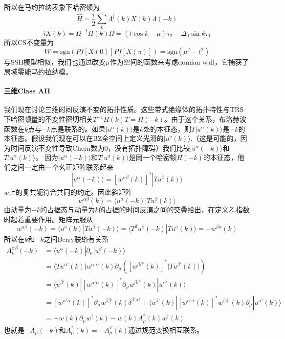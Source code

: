 \documentclass[a4paper]{article}
\numberwithin{equation}{subsection}
\begin{document}
所以在马约拉纳表象下哈密顿为
\begin{equation}
    \hat{H}=\frac{i}{2}\sum_{k}\Lambda^\dagger(k)X(k)\Lambda(-k)
\end{equation}
\begin{equation}
    iX(k)=\Omega^{-1}H(k)\Omega=(t\cos k-\mu)\tau_2-\Delta_0\sin k\tau_1
\end{equation}
所以CS不变量为
\begin{equation}
    W=\mathrm{sgn}(Pf[X(0)]Pf[X(\pi)])=\mathrm{sgn}(\mu^2-t^2)
\end{equation}
与SSH模型相似，我们也通过改变$\mu$作为空间的函数来考虑domian wall，它捕获了局域零能马约拉纳模。
\paragraph{三维Class AII}
我们现在讨论三维时间反演不变的拓扑性质。这些带式绝缘体的拓扑特性与TRS下哈密顿量的不变性密切相关$T^{-1}H(k)T=H(-k)$。由于这个关系，布洛赫波函数在$k$点与$-k$点是联系的。如果$|u^\alpha(k)\rangle$是$k$处的本征态，则$T|u^\alpha(k)\rangle$是$-k$的本征态。假设我们现在可以在BZ全空间上定义光滑的$|u^a(k)\rangle$.（这是可能的，因为时间反演不变性导致Chern数为$0$，没有拓扑障碍）我们比较$|u^\alpha(-k)\rangle$和$T|u^\alpha(k)\rangle$。 因为$|u^\alpha(-k)\rangle$和$T|u^a(k)\rangle$是同一个哈密顿$H(-k)$的本征态，他们之间一定由一个幺正矩阵联系起来
\begin{equation}
    |u^\alpha(-k)\rangle=[w^{\alpha\beta}(k)]^*|Tu^\beta(k)\rangle
\end{equation} 
$w$上的复共轭符合共同的约定。因此斜矩阵
\begin{equation}
    w^{\alpha\beta}(k)=\langle u^\alpha(-k)|Tu^\beta(k)\rangle
\end{equation}
由动量为$-k$的占据态与动量为$k$的占据的时间反演之间的交叠给出，在定义$Z_2$指数时起着重要作用。矩阵元服从
\begin{equation}
    w^{\alpha\beta}(-k)=\langle u^a(k)|T u^\beta(-k)\rangle=\langle T^2 u^\beta(-k)|Tu^a(k)\rangle=-w^{\beta\alpha}(k)
\end{equation}
所以在$k$和$-k$之间Berry联络有关系
\begin{equation}
    \begin{split}
        A_\mu^{\alpha\beta}(-k)&=\langle u^\alpha(-k)|\partial_\mu|u^\beta(-k)\rangle\\
        &=\langle T u^{\alpha'}(k)|w^{\alpha'\alpha}(k)\partial_\mu\left([w^{\beta\beta'}(k)]^*|Tu^{\beta'}(k)\rangle\right)\\
        &=\langle u^{\beta'}(k)|[w^{\alpha'\alpha}(k)]^*\partial_\mu w^{\beta\beta'}(k)|u^{\alpha'}(k)\rangle\\
        &=[w^{\alpha'\alpha}(k)]^*\partial_\mu w^{\beta\beta'}(k)\delta^{\beta'\alpha'}+\langle u^{\beta'}(k)|[w^{\alpha'\alpha}(k)]^*w^{\beta\beta'}(k)\partial_\mu|u^{\alpha'}(k)\rangle\\
        &=-w(k)\partial_\mu w^\dagger(k)-w(k)A_\mu^*(k)w^\dagger(k)
    \end{split}
\end{equation}
也就是$-A_\mu(-k)$和$A^*_\mu(k)=-A^T_\mu(k)$通过规范变换相互联系。
\end{document}
